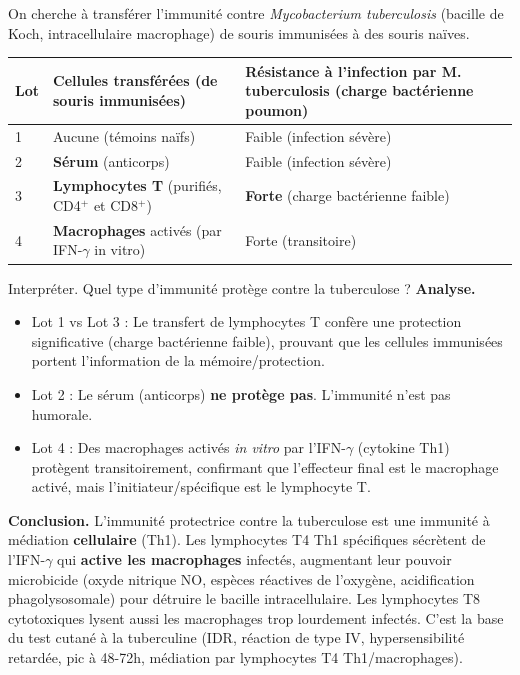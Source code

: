\documentclass[11pt]{article}
\begin{document}
\begin{exoresolu}
On cherche à transférer l'immunité contre \emph{Mycobacterium tuberculosis} (bacille de Koch, intracellulaire macrophage) de souris immunisées à des souris naïves.
\begin{center}
\begin{tabularx}{\linewidth}{|l|X|X|}\hline
\rowcolor{popblueL} \textbf{Lot} & \textbf{Cellules transférées (de souris immunisées)} & \textbf{Résistance à l'infection par M. tuberculosis (charge bactérienne poumon)} \\ \hline
1 & Aucune (témoins naïfs) & Faible (infection sévère) \\ \hline
2 & \textbf{Sérum} (anticorps) & Faible (infection sévère) \\ \hline
3 & \textbf{Lymphocytes T} (purifiés, CD4$^{+}$ et CD8$^{+}$) & \textbf{Forte} (charge bactérienne faible) \\ \hline
4 & \textbf{Macrophages} activés (par IFN-$\gamma$ in vitro) & Forte (transitoire) \\ \hline
\end{tabularx}
\end{center}
Interpréter. Quel type d'immunité protège contre la tuberculose ?
\tcblower
\textbf{Analyse.}
\begin{itemize}
\item Lot 1 vs Lot 3 : Le transfert de lymphocytes T confère une protection significative (charge bactérienne faible), prouvant que les cellules immunisées portent l'information de la mémoire/protection.
\item Lot 2 : Le sérum (anticorps) \textbf{ne protège pas}. L'immunité n'est pas humorale.
\item Lot 4 : Des macrophages activés \textit{in vitro} par l'IFN-$\gamma$ (cytokine Th1) protègent transitoirement, confirmant que l'effecteur final est le macrophage activé, mais l'initiateur/spécifique est le lymphocyte T.
\end{itemize}
\textbf{Conclusion.} L'immunité protectrice contre la tuberculose est une immunité à médiation \textbf{cellulaire} (Th1). Les lymphocytes T4 Th1 spécifiques sécrètent de l'IFN-$\gamma$ qui \textbf{active les macrophages} infectés, augmentant leur pouvoir microbicide (oxyde nitrique NO, espèces réactives de l'oxygène, acidification phagolysosomale) pour détruire le bacille intracellulaire. Les lymphocytes T8 cytotoxiques lysent aussi les macrophages trop lourdement infectés. C'est la base du test cutané à la tuberculine (IDR, réaction de type IV, hypersensibilité retardée, pic à 48-72h, médiation par lymphocytes T4 Th1/macrophages).
\end{exoresolu}
\end{document}
